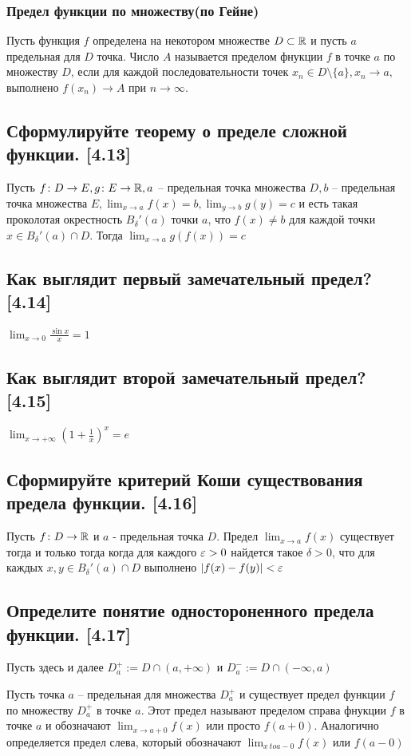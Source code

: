 \documentclass[12pt, a4paper]{article}
\begin{document}
    \subsubsection{Предел функции по множеству(по Гейне)}
    Пусть функция $f$ определена на некотором множестве $D \subset \mathbb{R}$ и пусть $a$ предельная для $D$ точка. Число $A$ называется пределом фнукции $f$ в точке $a$ по множеству $D$, если для каждой последовательности точек $x_n \in D \setminus \{a\}, x_n \to a,$ выполнено $f(x_n) \to A$ при $n \to \infty$.
    \subsection{Сформулируйте теорему о пределе сложной функции. [4.13]}
    Пусть $f \colon D \to E, g \colon E \to \mathbb{R}, a$ -- предельная точка множества $D, b$ -- предельная точка множества $E, \lim_{x \to a} f(x) = b, \lim_{y \to b} g(y) = c$ и есть такая проколотая окрестность $B_{\delta}' (a)$ точки $a$, что $f(x) \ne b$ для каждой точки $x \in B_{\delta}'(a) \cap D$. Тогда $\lim_{x \to a} g(f(x)) = c$
    \subsection{Как выглядит первый замечательный предел? [4.14]}
    $\lim_{x \to 0} \frac{\sin x}{x} = 1$
    \subsection{Как выглядит второй замечательный предел? [4.15]}
    $\lim_{x \to + \infty} \left(1 + \frac{1}{x}\right)^x = e$
    \subsection{Сформируйте критерий Коши существования предела функции. [4.16]}
    Пусть $f \colon D \to \mathbb{R}$ и $a$ - предельная точка $D$. Предел $\lim_{x \to a} f(x)$ существует тогда и только тогда когда для каждого $\varepsilon > 0$ найдется такое $\delta > 0$, что для каждых $x, y \in B_{\delta}'(a) \cap D$ выполнено $|f(x) - f(y)| < \varepsilon$
    \subsection{Определите понятие одностороненного предела функции. [4.17]}
    Пусть здесь и далее $D^{+}_a := D \cap (a, + \infty)$ и $D^{-}_a := D \cap (-\infty, a)$

    Пусть точка $a$ -- предельная для множества $D^{+}_a$ и существует предел функции $f$ по множеству $D^{+}_a$ в точке $a$. Этот предел называют пределом справа фнукции $f$ в точке $a$ и обозначают $\lim_{x \to a + 0} f(x)$ или просто $f(a + 0)$. Аналогично определяется предел слева, который обозначают $\lim_{x \ to a - 0} f(x)$ или $f(a - 0)$
\end{document}
